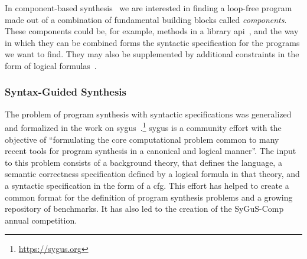 In component-based
synthesis~\cite{Shi:2019:FCS,Feng:2018:PSU,Feng:2017:CST,Feng:2017:CSC,Jha:oracle:2010}
we are interested in finding a loop-free program made out of a combination of
fundamental building blocks called \textit{components}. These components could
be, for example, methods in a library
\gls{api}~\cite{Shi:2019:FCS,Feng:2017:CSC}, and the way in which they can be
combined forms the syntactic specification for the programs we want to find.
They may also be supplemented by additional constraints in the form of logical
formulas~\cite{Feng:2018:PSU}.

\subsubsection{Syntax-Guided Synthesis}
\label{sec:sygus}

The problem of program synthesis with syntactic specifications was generalized
and formalized in the work on
\gls{sygus}~\cite{Alur:sygus:2013}.\footnote{\url{https://sygus.org}}
\gls{sygus} is a community effort with the objective of ``formulating the core
computational problem common to many recent tools for program synthesis in a
canonical and logical manner''.
The input to this problem consists of a background theory, that defines the
language, a semantic correctness specification defined by a logical formula in
that theory, and a syntactic specification in the form of a \gls{cfg}.
This effort has helped to create a common format for the definition of program
synthesis problems and a growing repository of benchmarks. It has also led to
the creation of the SyGuS-Comp annual competition.